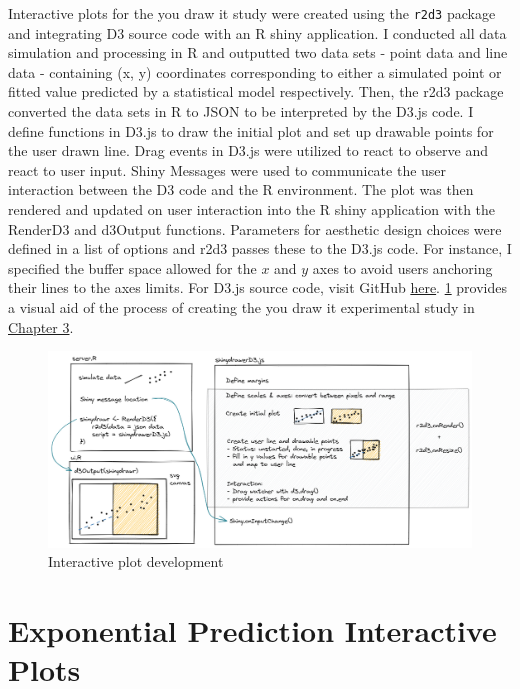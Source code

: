 \documentclass[print]{nuthesis}
\begin{document}
Interactive plots for the you draw it study were created using the \texttt{r2d3} package and integrating D3 source code with an R shiny application.
I conducted all data simulation and processing in R and outputted two data sets - point data and line data - containing (x, y) coordinates corresponding to either a simulated point or fitted value predicted by a statistical model respectively.
Then, the r2d3 package converted the data sets in R to JSON to be interpreted by the D3.js code.
I define functions in D3.js to draw the initial plot and set up drawable points for the user drawn line.
Drag events in D3.js were utilized to react to observe and react to user input.
Shiny Messages were used to communicate the user interaction between the D3 code and the R environment.
The plot was then rendered and updated on user interaction into the R shiny application with the RenderD3 and d3Output functions.
Parameters for aesthetic design choices were defined in a list of options and r2d3 passes these to the D3.js code.
For instance, I specified the buffer space allowed for the \(x\) and \(y\) axes to avoid users anchoring their lines to the axes limits. For D3.js source code, visit GitHub \href{https://github.com/srvanderplas/Perception-of-Log-Scales/blob/master/you-draw-it-development/you-draw-it-test-app/main.js}{here}.
\cref{fig:r2d3-shiny-flowchart} provides a visual aid of the process of creating the you draw it experimental study in \protect\hyperlink{youdrawit}{Chapter 3}.

\begin{figure}[tbp]

{\centering \includegraphics[width=1\linewidth,]{images/02-you-draw-it/r2d3+shiny} 

}

\caption{Interactive plot development}\label{fig:r2d3-shiny-flowchart}
\end{figure}

\hypertarget{exponential-prediction-plots}{%
\chapter{Exponential Prediction Interactive Plots}\label{exponential-prediction-plots}}
\end{document}
